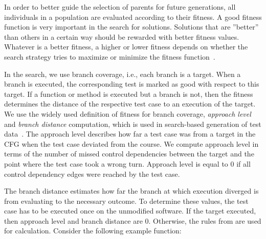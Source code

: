 \documentclass[paper=a4,%
  twoside,%
  BCOR4mm,%
  abstract=true,%
  toc=bibliography,%
  chapterprefix=true,%
  toc=bibliographynumbered,%
  open=right,%
  english,%
  pagesize=pdftex]{scrreprt}
\begin{document}
In order to better guide the selection of parents for future generations, all individuals in a population are evaluated according to their fitness. A good fitness function is very important in the search for solutions. Solutions that are ''better'' than others in a certain way should be rewarded with better fitness values. Whatever is a better fitness, a higher or lower fitness depends on whether the search strategy tries to maximize or minimize the fitness function~\cite{McMinn_2004}.



In the search, we use branch coverage, i.e., each branch is a target. When a branch is executed, the corresponding test is marked as good with respect to this target. If a function or method is executed but a branch is not, then the fitness determines the distance of the respective test case to an execution of the target. We use the widely used definition of fitness for branch coverage, \textit{approach level} and \textit{branch distance} computation, which is used in search-based generation of test data~\cite{McMinn_2004}. The approach level describes how far a test case was from a target in the \ac{CFG} when the test case deviated from the course. We compute approach level in terms of the number of missed control dependencies between the target and the point where the test case took a wrong turn. Approach level is equal to $0$ if all control dependency edges were reached by the test case.

The branch distance estimates how far the branch at which execution diverged is from evaluating to the necessary outcome. To determine these values, the test case has to be executed once on the unmodified software. If the target executed, then approach level and branch distance are $0$. Otherwise, the rules from  are used for calculation. Consider the following example function:
\end{document}
